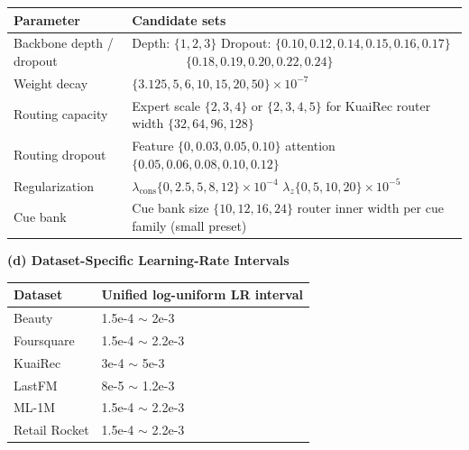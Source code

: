 \documentclass[sigconf,review,anonymous]{acmart}
\begin{document}
\begin{table}[!t]
\begin{minipage}[t]{0.50\textwidth}
    \vspace{0.25em}
    \scriptsize
    \setlength{\tabcolsep}{4pt}
    \renewcommand{\arraystretch}{1.03}
    \begin{tabularx}{\linewidth}{@{}lX@{}}
      \toprule
      Parameter & Candidate sets \\
      \midrule
      Backbone depth / dropout & Depth: $\{1,2,3\}$\newline
      Dropout: $\{0.10,0.12,0.14,0.15,0.16,0.17\}$\newline
      $\phantom{\text{Dropout: }}\{0.18,0.19,0.20,0.22,0.24\}$ \\
      Weight decay & $\{3.125,5,6,10,15,20,50\}\times10^{-7}$ \\
      Routing capacity & Expert scale $\{2,3,4\}$ or $\{2,3,4,5\}$ for KuaiRec\newline
      router width $\{32,64,96,128\}$ \\
      Routing dropout & Feature $\{0,0.03,0.05,0.10\}$\newline
      attention $\{0.05,0.06,0.08,0.10,0.12\}$ \\
      Regularization & $\lambda_{\mathrm{cons}}\{0,2.5,5,8,12\}\times10^{-4}$\newline
      $\lambda_z\{0,5,10,20\}\times10^{-5}$ \\
      Cue bank & Cue bank size $\{10,12,16,24\}$\newline
      router inner width per cue family (small preset) \\
      \bottomrule
    \end{tabularx}
  \end{minipage}\hfill
  \begin{minipage}[t]{0.42\textwidth}
    \textbf{(d) Dataset-Specific Learning-Rate Intervals}

    \vspace{0.25em}
    \scriptsize
    \setlength{\tabcolsep}{4pt}
    \renewcommand{\arraystretch}{1.03}
    \begin{tabularx}{\linewidth}{@{}lX@{}}
      \toprule
      Dataset & Unified log-uniform LR interval \\
      \midrule
      Beauty & 1.5e-4 $\sim$ 2e-3 \\
      Foursquare & 1.5e-4 $\sim$ 2.2e-3 \\
      KuaiRec & 3e-4 $\sim$ 5e-3 \\
      LastFM & 8e-5 $\sim$ 1.2e-3 \\
      ML-1M & 1.5e-4 $\sim$ 2.2e-3 \\
      Retail Rocket & 1.5e-4 $\sim$ 2.2e-3 \\
      \bottomrule
    \end{tabularx}
  \end{minipage}
\end{table}
\end{document}
